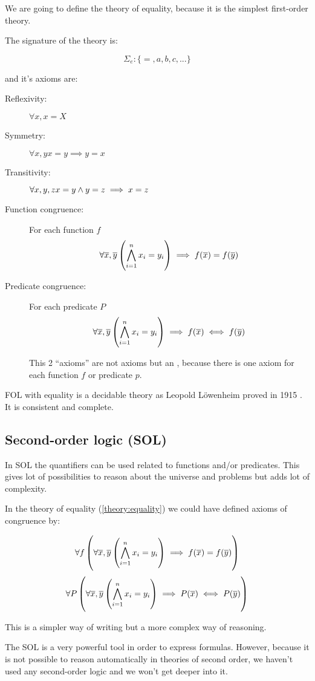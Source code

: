 \begin{example}

\label{theory:equality}

We are going to define the theory of equality, because it is the simplest first-order theory.

The signature of the theory is:

\[\Sigma_e:\{=,a,b,c,...\}\]

and it's axioms are:

\begin{description}
	\item[Reflexivity:	] $\forall x, x=X$
	\item[Symmetry:	] $\forall x,y x=y \implies y=x$
	\item[Transitivity:	] $\forall x,y,z x=y \wedge y=z \implies x=z$
	\item[Function congruence:] For each function $f$
	\[\forall \overline{x},\overline{y} \left( \bigwedge_{i=1}^n x_i = y_i \right) \implies f(\overline{x}) = f(\overline{y})\]
	\item[Predicate congruence:]  For each predicate $P$
	\[\forall \overline{x},\overline{y} \left( \bigwedge_{i=1}^n x_i = y_i \right) \implies f(\overline{x}) \iff f(\overline{y})\]

	This 2 ``axioms'' are not axioms but an , because there is one axiom for each function $f$ or predicate $p$.
\end{description}

\gls{FOL} with equality is a decidable theory as Leopold Löwenheim proved in 1915 \cite{EqualityIsDecidable}. It is consistent and complete.
\end{example}

\subsection{Second-order logic (SOL)}

In \gls{SOL} the quantifiers can be used related to functions and/or predicates. This gives lot of possibilities to reason about the universe and problems but adds lot of complexity. 

In the theory of equality (\ref{theory:equality}) we could have defined axioms of congruence by:

\[\forall f \left( \forall \overline{x},\overline{y} \left( \bigwedge_{i=1}^n x_i = y_i \right) \implies f(\overline{x}) = f(\overline{y}) \right)\]
\[\forall P \left( \forall \overline{x},\overline{y} \left( \bigwedge_{i=1}^n x_i = y_i \right) \implies P(\overline{x}) \iff P(\overline{y}) \right)\]

This is a simpler way of writing but a more complex way of reasoning.

The \gls{SOL} is a very powerful tool in order to express formulas. 
%
However, because it is not possible to reason automatically in theories of second order, we haven't used any second-order logic and we won't get deeper into it. 

